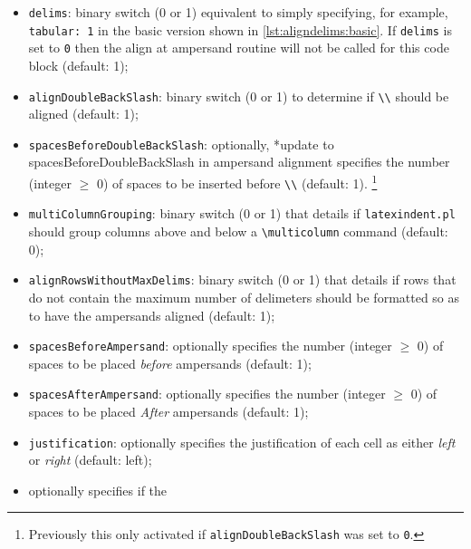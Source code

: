 	\begin{itemize}
		\item \texttt{delims}: binary switch (0 or 1) equivalent to simply specifying, for
		      example, \texttt{tabular: 1} in the basic version shown in \cref{lst:aligndelims:basic}. If
		      \texttt{delims} is set to \texttt{0} then the align at ampersand
		      routine will not be called for this code block (default: 1);
		\item \texttt{alignDoubleBackSlash}: binary switch (0 or 1) to determine if \lstinline!\\!
		      should be aligned (default: 1);
		\item \texttt{spacesBeforeDoubleBackSlash}: optionally,%
		      *{update to spacesBeforeDoubleBackSlash in ampersand alignment} specifies the number (integer $\geq$ 0) of spaces
		      to be inserted before \lstinline!\\! (default: 1). \footnote{Previously this only activated if \texttt{alignDoubleBackSlash} was set to \texttt{0}.}
		\item {} \texttt{multiColumnGrouping}: binary switch (0 or 1) that details if
		      \texttt{latexindent.pl} should group columns
		      above and below a \lstinline!\multicolumn! command (default: 0);
		\item {} \texttt{alignRowsWithoutMaxDelims}: binary switch (0 or 1) that details if
		      rows that do not contain the maximum number of delimeters should be formatted so as to
		      have the ampersands aligned (default: 1);
		\item {}\texttt{spacesBeforeAmpersand}: optionally specifies the number (integer
		      $\geq$ 0) of
		      spaces to be placed \emph{before} ampersands (default: 1);
		\item {}\texttt{spacesAfterAmpersand}: optionally specifies the number (integer
		      $\geq$ 0) of
		      spaces to be placed \emph{After} ampersands (default: 1);
		\item {}\texttt{justification}: optionally specifies the justification of
		      each cell as either \emph{left} or \emph{right} (default: left);
		\item {} optionally specifies if the

\end{itemize}

